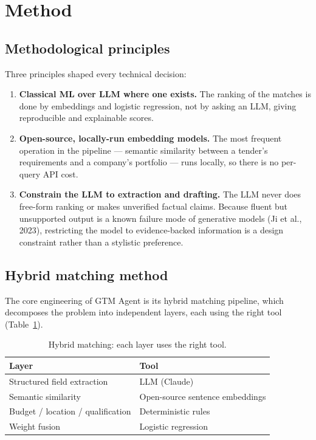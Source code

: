 \section{Method}

\subsection{Methodological principles}
Three principles shaped every technical decision:

\begin{enumerate}
\tightlist
\item \textbf{Classical ML over LLM where one exists.} The ranking of the matches is
  done by embeddings and logistic regression, not by asking an LLM, giving
  reproducible and explainable scores.
\item \textbf{Open-source, locally-run embedding models.} The most frequent operation
  in the pipeline --- semantic similarity between a tender's requirements and a
  company's portfolio --- runs locally, so there is no per-query API cost.
\item \textbf{Constrain the LLM to extraction and drafting.} The LLM never does
  free-form ranking or makes unverified factual claims. Because fluent but
  unsupported output is a known failure mode of generative models (Ji et al., 2023),
  restricting the model to evidence-backed information is a design constraint rather
  than a stylistic preference.
\end{enumerate}

\subsection{Hybrid matching method}
The core engineering of GTM Agent is its hybrid matching pipeline, which decomposes
the problem into independent layers, each using the right tool
(Table~\ref{tab:layers}).

\begin{table}[!ht]
\centering
\caption[Hybrid matching layers]{Hybrid matching: each layer uses the right
tool.}\label{tab:layers}
\renewcommand{\arraystretch}{1.2}
\begin{tabular}{@{}ll@{}}
\toprule
\textbf{Layer} & \textbf{Tool} \\
\midrule
Structured field extraction & LLM (Claude) \\
Semantic similarity & Open-source sentence embeddings \\
Budget / location / qualification & Deterministic rules \\
Weight fusion & Logistic regression \\
\bottomrule
\end{tabular}
\end{table}

